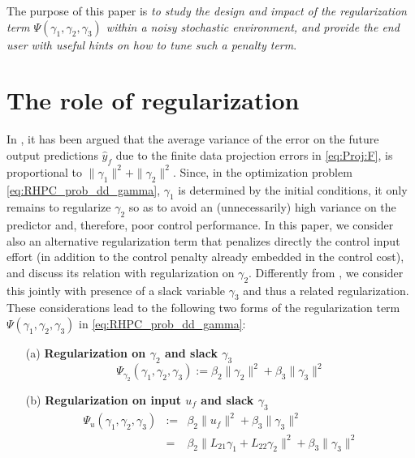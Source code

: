 \documentclass[letterpaper, 10 pt, conference]{ieeeconf}  %
\begin{document}
The purpose of this paper is \textit{to study the design and impact  of the regularization term $\Psi(\gamma_1,\gamma_2,\gamma_3)$ within a noisy stochastic environment, and provide the end user with useful hints on how to tune such a penalty term}.

\section{The role of regularization}\label{sec:reg}

In \cite{breschi2022uncertainty}, it has been argued that the average variance of the error on the future output predictions $\hat y_f$ due to the finite data projection errors in \eqref{eq:Proj:F}, is proportional to $\|\gamma_1\|^2  + \|\gamma_2\|^2$. Since, in the optimization problem \eqref{eq:RHPC_prob_dd_gamma}, $\gamma_1$ is determined by the initial conditions, it only remains to regularize $\gamma_2$ so as to avoid an (unnecessarily) high variance on the predictor and, therefore, poor control performance. In this paper, we consider also an alternative regularization term that penalizes directly the control input effort (in addition to the control penalty already embedded in the control cost), and discuss its relation with regularization on $\gamma_2$. Differently from  \cite{breschi2022uncertainty}, we consider this jointly with presence of a slack variable $\gamma_3$ and thus a related regularization. These considerations lead to the following two forms  of the regularization term $\Psi(\gamma_1,\gamma_2,\gamma_3)$ in 
\eqref{eq:RHPC_prob_dd_gamma}:

\begin{enumerate}
	\item[(a)] {\bf Regularization on $\gamma_2$ and slack $\gamma_3$} 
	\begin{equation}\label{eq:reg1}
		\Psi_{\gamma_2}(\gamma_1,\gamma_2,\gamma_3) := \beta_2\|\gamma_2\|^2 + \beta_3 \|\gamma_3\|^2
	\end{equation}
	\item[(b)] {\bf Regularization on input $u_f$ and slack $\gamma_3$} 
	\begin{equation}\label{eq:reg2}
		\begin{array}{rcl}
			\Psi_u(\gamma_1,\gamma_2,\gamma_3) &:=& \beta_2\|u_f\|^2 + \beta_3 \|\gamma_3\|^2 \\
			& = & \beta_2\|L_{21} \gamma_1 + L_{22} \gamma_2\|^2 + \beta_3 \|\gamma_3\|^2 \\
		\end{array}
	\end{equation}
	
\end{enumerate}
\end{document}
